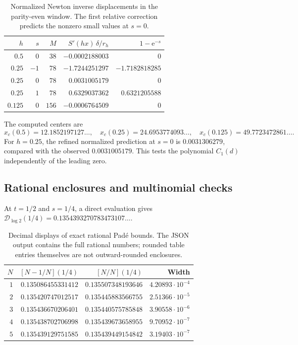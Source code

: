 \documentclass[11pt,a4paper]{article}
\newcommand{\ee}{\mathrm e}
\newcommand{\D}{\mathcal D}
\numberwithin{equation}{section}
\theoremstyle{plain}
\theoremstyle{definition}
\theoremstyle{remark}
\begin{document}
\begin{table}[htbp]
\centering
\begin{tabular}{@{}rrrrr@{}}
\toprule
$h$ & $s$ & $M$ & $S'(hx)\,\delta/r_h$ & $1-\ee^{-s}$\\
\midrule
$0.5$ & $0$ & $38$ & $-0.0002188003$ & $0$\\
$0.25$ & $-1$ & $78$ & $-1.7244251297$ & $-1.7182818285$\\
$0.25$ & $0$ & $78$ & $0.0031005179$ & $0$\\
$0.25$ & $1$ & $78$ & $0.6329037362$ & $0.6321205588$\\
$0.125$ & $0$ & $156$ & $-0.0006764509$ & $0$\\
\bottomrule
\end{tabular}
\caption{Normalized Newton inverse displacements in the parity-even window.
The first relative correction predicts the nonzero small values at $s=0$.}
\label{tab:window}
\end{table}

The computed centers are
\[
 x_c(0.5)=12.1852197127\ldots,\quad
 x_c(0.25)=24.6953774093\ldots,\quad
 x_c(0.125)=49.7723472861\ldots.
\]
For $h=0.25$, the refined normalized prediction at $s=0$ is
$0.0031306279$, compared with the observed $0.0031005179$.
This tests the polynomial $C_1(d)$ independently of the leading zero.

\subsection{Rational enclosures and multinomial checks}
At $t=1/2$ and $s=1/4$, a direct evaluation gives
$\D_{\log2}(1/4)=0.1354393270783473107\ldots$.
\begin{table}[htbp]
\centering
\begin{tabular}{@{}rrrr@{}}
\toprule
$N$ & $[N-1/N](1/4)$ & $[N/N](1/4)$ & Width\\
\midrule
$1$ & $0.135086455331412$ & $0.135507348193646$ & $4.20893\cdot10^{-4}$\\
$2$ & $0.135420747012517$ & $0.135445883566755$ & $2.51366\cdot10^{-5}$\\
$3$ & $0.135436670206401$ & $0.135440575785848$ & $3.90558\cdot10^{-6}$\\
$4$ & $0.135438702706998$ & $0.135439673658955$ & $9.70952\cdot10^{-7}$\\
$5$ & $0.135439129751585$ & $0.135439449154842$ & $3.19403\cdot10^{-7}$\\
\bottomrule
\end{tabular}
\caption{Decimal displays of exact rational Pad\'e bounds. The JSON output
contains the full rational numbers; rounded table entries themselves are not
outward-rounded enclosures.}
\label{tab:pade}
\end{table}
\end{document}
